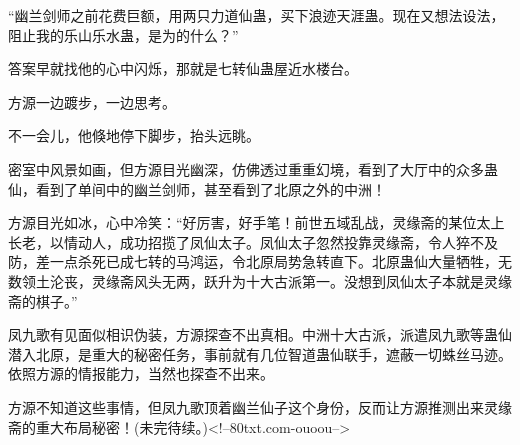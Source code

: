 \begin{this_body}
“幽兰剑师之前花费巨额，用两只力道仙蛊，买下浪迹天涯蛊。现在又想法设法，阻止我的乐山乐水蛊，是为的什么？”

答案早就找他的心中闪烁，那就是七转仙蛊屋近水楼台。

方源一边踱步，一边思考。

不一会儿，他倏地停下脚步，抬头远眺。

密室中风景如画，但方源目光幽深，仿佛透过重重幻境，看到了大厅中的众多蛊仙，看到了单间中的幽兰剑师，甚至看到了北原之外的中洲！

方源目光如冰，心中冷笑：“好厉害，好手笔！前世五域乱战，灵缘斋的某位太上长老，以情动人，成功招揽了凤仙太子。凤仙太子忽然投靠灵缘斋，令人猝不及防，差一点杀死已成七转的马鸿运，令北原局势急转直下。北原蛊仙大量牺牲，无数领土沦丧，灵缘斋风头无两，跃升为十大古派第一。没想到凤仙太子本就是灵缘斋的棋子。”

凤九歌有见面似相识伪装，方源探查不出真相。中洲十大古派，派遣凤九歌等蛊仙潜入北原，是重大的秘密任务，事前就有几位智道蛊仙联手，遮蔽一切蛛丝马迹。依照方源的情报能力，当然也探查不出来。

方源不知道这些事情，但凤九歌顶着幽兰仙子这个身份，反而让方源推测出来灵缘斋的重大布局秘密！(未完待续。)<!--80txt.com-ouoou-->

\end{this_body}

